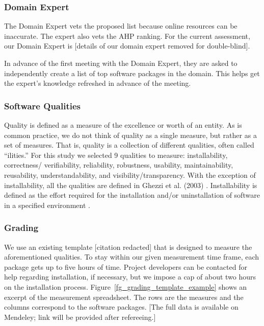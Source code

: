 \documentclass[final, 12pt, 3p, times]{elsarticle}
\begin{document}
\subsubsection{Domain Expert} \label{sec_vet_software_list}

The Domain Expert vets the proposed list because online resources can be
inaccurate.  The expert also vets the AHP ranking.  For the current assessment,
our Domain Expert is [details of our domain expert removed for double-blind].

In advance of the first meeting with the Domain Expert, they are asked to
independently create a list of top software packages in the domain.  This helps
get the expert's knowledge refreshed in advance of the meeting.

\subsubsection{Software Qualities} \label{sec_software_quality}

Quality is defined as a measure of the excellence or worth of an entity.  As is
common practice, we do not think of quality as a single measure, but rather as
a set of measures.  That is, quality is a collection of different qualities,
often called ``ilities.''  For this study we selected 9 qualities to measure:
installability, correctness/ verifiability, reliability, robustness, usability,
maintainability, reusability, understandability, and visibility/transparency.
With the exception of installability, all the qualities are defined in Ghezzi
et al. (2003) \cite{GhezziEtAl2003}. Installability is defined as the effort
required for the installation and/or uninstallation of software in a specified
environment \cite{ISO/IEC25010}.

\subsubsection{Grading} \label{sec_grading_software}

We use an existing template [citation redacted]
that is designed to measure the
aforementioned qualities. To stay within our given measurement time frame, each
package gets up to five hours of time.  Project developers can be contacted for
help regarding installation, if necessary, but we impose a cap of about two
hours on the installation process.  Figure~\ref{fg_grading_template_example}
shows an excerpt of the measurement spreadsheet.  The rows are the measures and
the columns correspond to the software packages.  [The full data is available on
Mendeley; link will be provided after refereeing.] 
\end{document}
